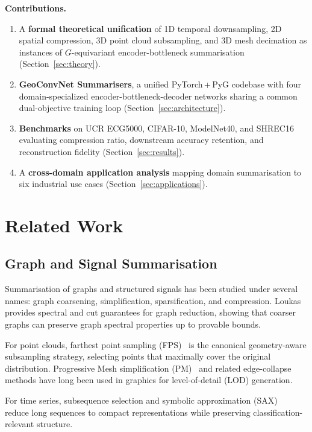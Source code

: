 \documentclass[10pt,conference]{IEEEtran}
\begin{document}
\smallskip\noindent\textbf{Contributions.}
\begin{enumerate}
  \item A \textbf{formal theoretical unification} of 1D temporal
    downsampling, 2D spatial compression, 3D point cloud subsampling, and
    3D mesh decimation as instances of $G$-equivariant encoder-bottleneck
    summarisation (Section~\ref{sec:theory}).
  \item \textbf{GeoConvNet Summarisers}, a unified PyTorch\,+\,PyG
    codebase with four domain-specialized encoder-bottleneck-decoder
    networks sharing a common dual-objective training loop
    (Section~\ref{sec:architecture}).
  \item \textbf{Benchmarks} on UCR ECG5000, CIFAR-10, ModelNet40, and
    SHREC16 evaluating compression ratio, downstream accuracy retention,
    and reconstruction fidelity (Section~\ref{sec:results}).
  \item A \textbf{cross-domain application analysis} mapping domain
    summarisation to six industrial use cases (Section~\ref{sec:applications}).
\end{enumerate}

\section{Related Work}
\label{sec:related}

\subsection{Graph and Signal Summarisation}

Summarisation of graphs and structured signals has been studied under
several names: graph coarsening, simplification, sparsification, and
compression.  Loukas~\cite{loukas2019graph} provides spectral and cut
guarantees for graph reduction, showing that coarser graphs can preserve
graph spectral properties up to provable bounds.

For point clouds, farthest point sampling (FPS)~\cite{qi2017pointnetplusplus}
is the canonical geometry-aware subsampling strategy, selecting points
that maximally cover the original distribution.  Progressive Mesh
simplification (PM)~\cite{hanocka2019meshcnn} and related edge-collapse
methods have long been used in graphics for level-of-detail (LOD) generation.

For time series, subsequence selection and symbolic approximation
(SAX)~\cite{bagnall2017great} reduce long sequences to compact
representations while preserving classification-relevant structure.
\end{document}
